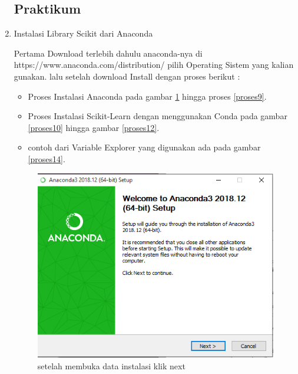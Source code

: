 \begin{enumerate}
\subsection{Praktikum}
\item
Instalasi Library Scikit dari Anaconda

\subitem
Pertama Download terlebih dahulu anaconda-nya di https://www.anaconda.com/distribution/ pilih Operating Sistem yang kalian gunakan. lalu setelah download Install dengan proses berikut :
\begin{itemize}
\item
Proses Instalasi Anaconda pada gambar \ref{proses2} hingga proses \ref{proses9}.
\item
Proses Instalasi Scikit-Learn dengan menggunakan Conda pada gambar \ref{proses10} hingga gambar \ref{proses12}.
\item
contoh dari Variable Explorer yang digunakan ada pada gambar \ref{proses14}.
\end{itemize}
\begin{figure}[ht]
\centerline{\includegraphics[width=1\textwidth]{figures/fathi/2.PNG}}
\caption{setelah membuka data instalasi klik next}
\label{proses2}


\end{figure}
\end{enumerate}
